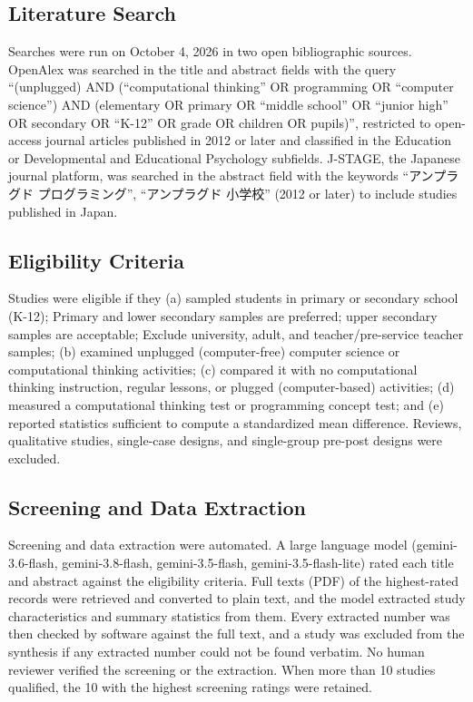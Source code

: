 \documentclass[man,a4paper,12pt,floatsintext,nolmodern,notab]{apa7}
\begin{document}
\subsection{Literature Search}
Searches were run on October 4, 2026 in two open bibliographic sources. OpenAlex was searched in the title and abstract fields with the query “(unplugged) AND (“computational thinking” OR programming OR “computer science”) AND (elementary OR primary OR “middle school” OR “junior high” OR secondary OR “K-12” OR grade OR children OR pupils)”, restricted to open-access journal articles published in 2012 or later and classified in the Education or Developmental and Educational Psychology subfields. J-STAGE, the Japanese journal platform, was searched in the abstract field with the keywords “{\cjkfont アンプラグド} {\cjkfont プログラミング}”, “{\cjkfont アンプラグド} {\cjkfont 小学校}” (2012 or later) to include studies published in Japan.

\subsection{Eligibility Criteria}
Studies were eligible if they (a) sampled students in primary or secondary school (K-12); Primary and lower secondary samples are preferred; upper secondary samples are acceptable; Exclude university, adult, and teacher/pre-service teacher samples; (b) examined unplugged (computer-free) computer science or computational thinking activities; (c) compared it with no computational thinking instruction, regular lessons, or plugged (computer-based) activities; (d) measured a computational thinking test or programming concept test; and (e) reported statistics sufficient to compute a standardized mean difference. Reviews, qualitative studies, single-case designs, and single-group pre-post designs were excluded.

\subsection{Screening and Data Extraction}
Screening and data extraction were automated. A large language model (gemini-3.6-flash, gemini-3.8-flash, gemini-3.5-flash, gemini-3.5-flash-lite) rated each title and abstract against the eligibility criteria. Full texts (PDF) of the highest-rated records were retrieved and converted to plain text, and the model extracted study characteristics and summary statistics from them. Every extracted number was then checked by software against the full text, and a study was excluded from the synthesis if any extracted number could not be found verbatim. No human reviewer verified the screening or the extraction. When more than 10 studies qualified, the 10 with the highest screening ratings were retained.
\end{document}
